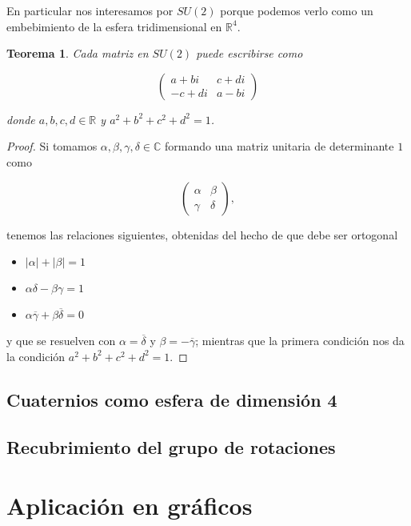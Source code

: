 \documentclass{article}
\theoremstyle{plain}
\newtheorem{theorem}{Teorema}
\theoremstyle{definition}
\theoremstyle{remark}
\begin{document}
En particular nos interesamos por $SU(2)$ porque podemos verlo como un embebimiento de la
esfera tridimensional en $\mathbb{R}^4$.

\begin{theorem}
  Cada matriz en $SU(2)$ puede escribirse como
  
  \[\begin{pmatrix}
      a+bi & c+di \\
      -c+di & a-bi
    \end{pmatrix}\]
  
  donde $a,b,c,d \in \mathbb{R}$ y $a^2+b^2+c^2+d^2 = 1$.
\end{theorem}
\begin{proof}
  Si tomamos $\alpha,\beta,\gamma,\delta \in \mathbb{C}$ formando una matriz unitaria de
  determinante $1$ como

    \[\begin{pmatrix}
      \alpha & \beta \\
      \gamma & \delta
    \end{pmatrix},\]

  tenemos las relaciones siguientes, obtenidas del hecho de que debe ser ortogonal

  \begin{itemize}
    \item $|\alpha|+|\beta| = 1$
    \item $\alpha\delta-\beta\gamma = 1$
    \item $\alpha\overline{\gamma} + \beta\overline{\delta} = 0$
  \end{itemize}
   
  y que se resuelven con $\alpha = \overline{\delta}$ y
  $\beta = -\overline{\gamma}$; mientras que la primera condición
  nos da la condición $a^2+b^2+c^2+d^2 = 1$.
\end{proof}


\subsection{Cuaternios como esfera de dimensión 4}
\subsection{Recubrimiento del grupo de rotaciones}


\section{Aplicación en gráficos}
\end{document}
